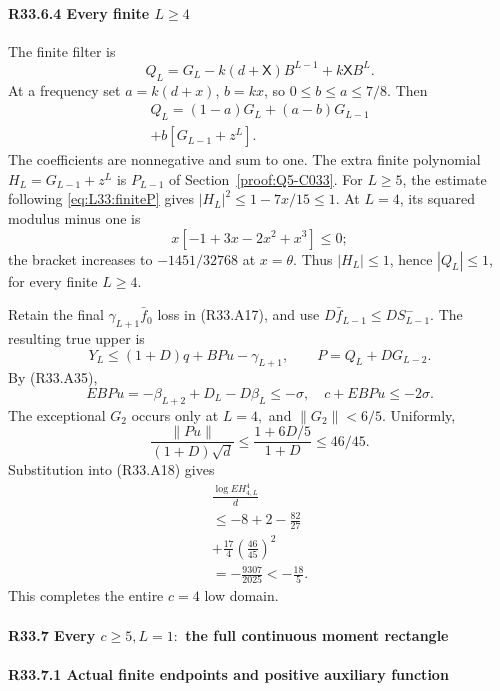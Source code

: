 \paragraph{R33.6.4 Every finite \(L\ge 4\)}\label{part:R33.6.4}

The finite filter is
\[
Q_L=G_L-k(d+\mathsf X)B^{L-1}+k\mathsf XB^L.
\]
At a frequency set \(a=k(d+x)\), \(b=kx\), so
\(0\le b\le a\le7/8\). Then
\[
\begin{gathered}
Q_L=(1-a)G_L+(a-b)G_{L-1}\\
+b[G_{L-1}+z^L].
\end{gathered}\tag{R33.A38}
\]
The coefficients are nonnegative and sum to one.
The extra finite polynomial \(H_L=G_{L-1}+z^L\) is
\(P_{L-1}\) of Section~\ref{proof:Q5-C033}.
For \(L\ge5\), the estimate following \eqref{eq:L33:finiteP} gives
\(|H_L|^2\le1-7x/15\le1\).
At \(L=4\), its squared modulus minus one is
\[
 x[-1+3x-2x^2+x^3]\le0;
\]
the bracket increases to \(-1451/32768\) at \(x=\theta\).
Thus \(|H_L|\le1\), hence \(|Q_L|\le1\), for every finite \(L\ge4\).

Retain the final \(\gamma_{L+1}\bar f_0\) loss in (R33.A17), and use
\(D\bar f_{L-1}\le DS^-_{L-1}\). The resulting true upper is
\[
Y_L\le(1+D)q+BPu-\gamma_{L+1},\qquad
P=Q_L+DG_{L-2}.
\]
By (R33.A35),
\[
EBPu=-\beta_{L+2}+D_L-D\beta_L\le-\sigma,
\quad c+EBPu\le-2\sigma.
\]
The exceptional \(G_2\) occurs only at \(L=4,\allowbreak \) and
\(\|G_2\|<6/5\). Uniformly,
\[
\frac{\|Pu\|}{(1+D)\sqrt d}
\le\frac{1+6D/5}{1+D}\le46/45.
\]
Substitution into (R33.A18) gives
\[
\begin{gathered}
\frac{\log EH_{4,L}^4}{d}\\
\le-8+2-\frac{82}{27}\\
+\frac{17}{4}\left(\frac{46}{45}\right)^2\\
=-\frac{9307}{2025}<-\frac{18}{5}.
\end{gathered}\tag{R33.A39}
\]
This completes the entire \(c=4\) low domain.

\paragraph{R33.7 Every \(c\ge 5,\allowbreak  L=1:\) the full continuous moment rectangle}

\paragraph{R33.7.1 Actual finite endpoints and positive auxiliary function}

